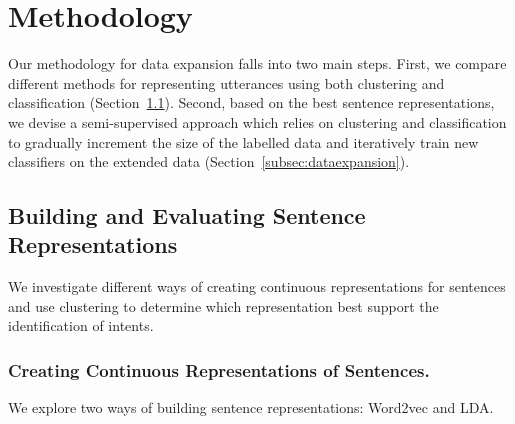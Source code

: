 \documentclass[11pt]{article}
\begin{document}
\section{Methodology}
\label{sec:methodology}

Our methodology for data expansion falls into two main steps. First, we compare different methods for representing utterances using both clustering and classification (Section~\ref{subsec:sentencerepresentations}). Second, based on the best sentence representations, we devise a semi-supervised approach which relies on clustering and classification to gradually increment the size of the labelled data and iteratively train new classifiers on the extended data (Section~\ref{subsec:dataexpansion}). 






\subsection{Building and Evaluating Sentence Representations}
\label{subsec:sentencerepresentations}

We investigate different ways of creating continuous representations for sentences and use clustering to determine which representation best support the identification of intents. 

\subsubsection{Creating Continuous Representations of Sentences.}

We explore two ways of building sentence representations: Word2vec and LDA. %
\end{document}
